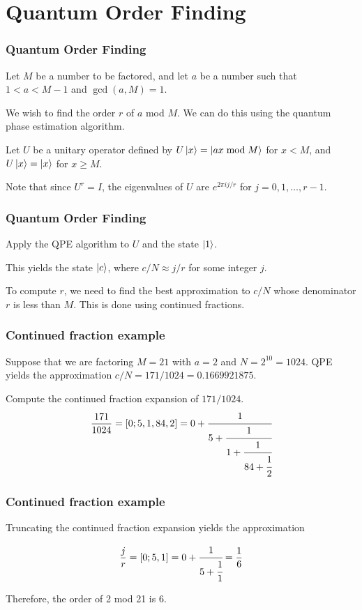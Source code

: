 \documentclass{beamer}
\begin{document}
\section*{Quantum Order Finding}

\begin{frame}
    \frametitle{Quantum Order Finding}

    Let $M$ be a number to be factored, and let $a$ be a number 
    such that $1 < a < M - 1$ and $\gcd(a, M) = 1$.

    \vspace{0.5cm}

    We wish to find the order $r$ of $a$ mod $M$.
    We can do this using the quantum phase estimation algorithm.

   \vspace{0.5cm}

   Let $U$ be a unitary operator defined by $U\left| x \right\rangle = \left| ax \bmod M \right\rangle$ 
   for $x < M$, and $U\left| x \right\rangle = \left| x \right\rangle$ for $x \geq M$.

   \vspace{0.5cm}

   Note that since $U^r = I$, the eigenvalues of $U$ are $e^{2\pi i j / r}$ 
   for $j = 0, 1, \ldots, r-1$.
 
\end{frame}



\begin{frame}
    \frametitle{Quantum Order Finding}

   Apply the QPE algorithm to $U$ and the state $\left| 1 \right\rangle$.

   This yields the state $\left| c \right\rangle$, where $c/N \approx j/r$
    for some integer $j$.

    \vspace{0.5cm}

    To compute $r$, we need to find the best approximation to $c/N$
    whose denominator $r$ is less than $M$. This is done using continued fractions.


\end{frame}

\begin{frame}
    \frametitle{Continued fraction example}

    Suppose that we are factoring $M = 21$ with $a=2$ and $N = 2^{10} = 1024$.
    QPE yields the approximation $c/N = 171/1024 = 0.1669921875$.
    
    Compute the continued fraction expansion of $171/1024$.
    $$\frac{171}{1024} = [0; 5, 1, 84, 2] = 0 + \cfrac{1}{5 + 
    \cfrac{1}{1 + \cfrac{1}{84 + \cfrac{1}{2}}}}$$
\end{frame}



\begin{frame}
    \frametitle{Continued fraction example}
    Truncating the continued fraction expansion yields the approximation

    $$\frac{j}{r} = [0; 5, 1] = 0 + \cfrac{1}{5 + \cfrac{1}{1}} = \frac{1}{6}$$

    Therefore, the order of 2 mod 21 is 6.

\end{frame}
\end{document}
